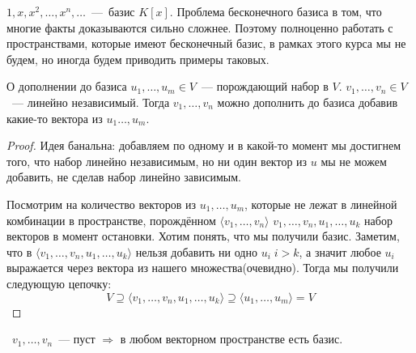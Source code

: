 \begin{example}
    $1, x, x^2, \dots, x^n, \dots$~---~базис $K[x]$. 
    Проблема бесконечного базиса в том, что многие факты доказываются сильно сложнее.
    Поэтому полноценно работать с пространствами, которые имеют бесконечный базис, в рамках этого
    курса мы не будем, но иногда будем приводить примеры таковых.
\end{example}
\begin{theorem}{О дополнении до базиса}
    $u_1,\dots,u_m\in V$~--- порождающий набор в $V$. $v_1,\dots,v_n\in V$~---
    линейно независимый. Тогда $v_1,\dots, v_n$ можно дополнить до базиса добавив
    какие-то вектора из $u_1\dots, u_m$.
\end{theorem}
\begin{proof}
Идея банальна: добавляем по одному и в какой-то момент мы достигнем того, что набор
линейно независимым, но ни один вектор из $u$ мы не можем добавить, не сделав набор
линейно зависимым.

Посмотрим на количество векторов из $u_1,\dots, u_m$, которые не
лежат в линейной комбинации в пространстве, порождённом $\langle  v_1,\dots, v_n\rangle$
$v_1,\dots,v_n, u_1,\dots, u_k$ набор векторов в момент остановки. Хотим понять, что
мы получили базис.
Заметим, что в $\langle v_1,\dots,v_n,u_1,\dots,u_k\rangle$ нельзя добавить ни одно $u_i\; i > k$, а значит
любое $u_i$ выражается через вектора из нашего множества(очевидно). Тогда мы получили
следующую цепочку:
$$V\supseteq \langle v_1,\dots,v_n, u_1,\dots,u_k\rangle \supseteq \langle u_1,\dots,u_m\rangle=V$$
\end{proof}
\follow~$v_1,\dots,v_n$~--- пуст $\Rightarrow$ в любом векторном пространстве есть базис.
